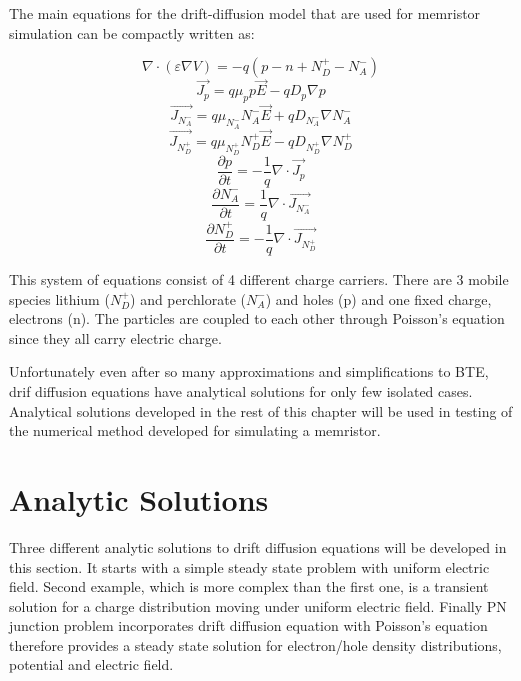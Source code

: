 The main equations for the drift-diffusion model that are used for memristor simulation can be compactly written as:

\begin{equation}
\nabla \cdot  (\varepsilon \nabla V)=-q(p-n+N_{D}^{+}-N_{A}^{-})
\end{equation}
\begin{equation}
\vec{J_p}=q\mu_p p \vec{E}-q D_p \nabla p
\end{equation}
\begin{equation}
\vec{J_{N_{A}^{-}}}=q\mu_{N_{A}^{-}} N_{A}^{-} \vec{E}+q D_{N_{A}^{-}} \nabla N_{A}^{-}
\end{equation}
\begin{equation}
\vec{J_{N_{D}^{+}}}=q\mu_{N_{D}^{+}} N_{D}^{+} \vec{E}-q D_{N_{D}^{+}} \nabla N_{D}^{+}
\end{equation}
\begin{equation}
\frac{\partial p}{\partial t}=-\frac{1}{q}\nabla \cdot \vec{J_p}
\end{equation}
\begin{equation}
\frac{\partial N_{A}^{-}}{\partial t}=\frac{1}{q}\nabla \cdot \vec{J_{N_{A}^{-}}}
\end{equation}
\begin{equation}
\frac{\partial N_{D}^{+}}{\partial t}=-\frac{1}{q}\nabla \cdot \vec{J_{N_{D}^{+}}}
\end{equation}

This system of equations consist of 4 different charge carriers. There are 3 mobile species lithium ($N_{D}^{+}$) and perchlorate ($N_{A}^{-}$) and holes (p) and one fixed charge, electrons (n). The particles are coupled to each other through Poisson's equation since they all carry electric charge. 

Unfortunately even after so many approximations and simplifications to BTE, drif diffusion equations have analytical solutions for only few isolated cases. Analytical solutions developed in the rest of this chapter will be used in testing of the numerical method developed for simulating a memristor. 

\clearpage
\section{Analytic Solutions}

Three different analytic solutions to drift diffusion equations will be developed in this section. It starts with a simple steady state problem with uniform electric field. Second example, which is more complex than the first one, is a  transient solution for a charge distribution moving under uniform electric field. Finally PN junction problem incorporates drift diffusion equation with Poisson's equation therefore provides a steady state solution for electron/hole density distributions, potential and electric field. 
  
